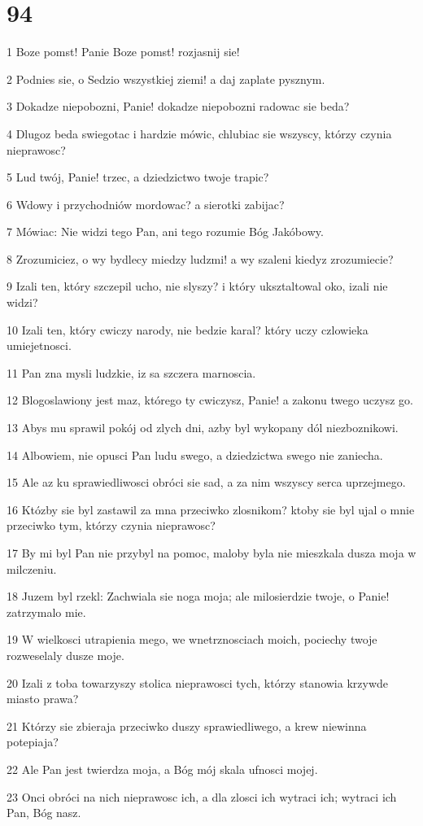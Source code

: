 \chapter{94}

\par 1 Boze pomst! Panie Boze pomst! rozjasnij sie!
\par 2 Podnies sie, o Sedzio wszystkiej ziemi! a daj zaplate pysznym.
\par 3 Dokadze niepobozni, Panie! dokadze niepobozni radowac sie beda?
\par 4 Dlugoz beda swiegotac i hardzie mówic, chlubiac sie wszyscy, którzy czynia nieprawosc?
\par 5 Lud twój, Panie! trzec, a dziedzictwo twoje trapic?
\par 6 Wdowy i przychodniów mordowac? a sierotki zabijac?
\par 7 Mówiac: Nie widzi tego Pan, ani tego rozumie Bóg Jakóbowy.
\par 8 Zrozumiciez, o wy bydlecy miedzy ludzmi! a wy szaleni kiedyz zrozumiecie?
\par 9 Izali ten, który szczepil ucho, nie slyszy? i który uksztaltowal oko, izali nie widzi?
\par 10 Izali ten, który cwiczy narody, nie bedzie karal? który uczy czlowieka umiejetnosci.
\par 11 Pan zna mysli ludzkie, iz sa szczera marnoscia.
\par 12 Blogoslawiony jest maz, którego ty cwiczysz, Panie! a zakonu twego uczysz go.
\par 13 Abys mu sprawil pokój od zlych dni, azby byl wykopany dól niezboznikowi.
\par 14 Albowiem, nie opusci Pan ludu swego, a dziedzictwa swego nie zaniecha.
\par 15 Ale az ku sprawiedliwosci obróci sie sad, a za nim wszyscy serca uprzejmego.
\par 16 Któzby sie byl zastawil za mna przeciwko zlosnikom? ktoby sie byl ujal o mnie przeciwko tym, którzy czynia nieprawosc?
\par 17 By mi byl Pan nie przybyl na pomoc, maloby byla nie mieszkala dusza moja w milczeniu.
\par 18 Juzem byl rzekl: Zachwiala sie noga moja; ale milosierdzie twoje, o Panie! zatrzymalo mie.
\par 19 W wielkosci utrapienia mego, we wnetrznosciach moich, pociechy twoje rozweselaly dusze moje.
\par 20 Izali z toba towarzyszy stolica nieprawosci tych, którzy stanowia krzywde miasto prawa?
\par 21 Którzy sie zbieraja przeciwko duszy sprawiedliwego, a krew niewinna potepiaja?
\par 22 Ale Pan jest twierdza moja, a Bóg mój skala ufnosci mojej.
\par 23 Onci obróci na nich nieprawosc ich, a dla zlosci ich wytraci ich; wytraci ich Pan, Bóg nasz.


